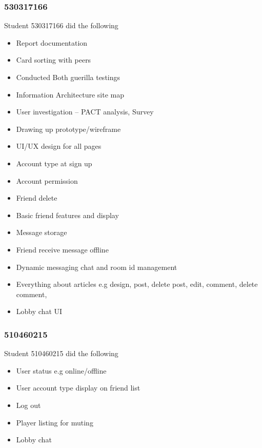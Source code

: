 \documentclass[12pt,a4paper]{article}
\begin{document}
\subsubsection*{530317166}
Student 530317166 did the following
\begin{itemize}
    \item Report documentation
    \item Card sorting with peers
    \item Conducted Both guerilla testings
    \item Information Architecture site map
    \item User investigation – PACT analysis, Survey
    \item Drawing up prototype/wireframe
    \item UI/UX design for all pages
    \item Account type at sign up
    \item Account permission 
    \item Friend delete
    \item Basic friend features and display
    \item Message storage 
    \item Friend receive message offline
    \item Dynamic messaging chat and room id management
    \item Everything about articles e.g design, post, delete post, edit, comment, delete comment, 
    \item Lobby chat UI
\end{itemize}

\subsubsection*{510460215}
Student 510460215 did the following
\begin{itemize}
    \item User status e.g online/offline
    \item User account type display on friend list
    \item Log out
    \item Player listing for muting 
    \item Lobby chat 
\end{itemize}
\end{document}
